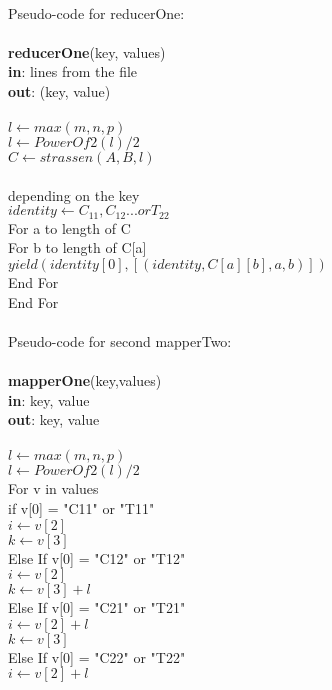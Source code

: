 \documentclass[10pt,a4paper]{article}
\begin{document}
\\Pseudo-code for reducerOne:\\ \\
\textbf{reducerOne}(key, values)\\
\textbf{in}: lines from the file\\
\textbf{out}: (key, value)\\\\
$l\leftarrow max(m,n,p)$\\
$l\leftarrow PowerOf2(l)/2$\\
$C\leftarrow strassen(A,B,l)$\\ \\
depending on the key\\
$identity \leftarrow C_{11}, C_{12} ... or T_{22}$\\
For a to length of C\\
\indent For b to length of C[a]\\
	\indent \indent $yield (identity[0], [(identity,C[a][b],a,b)])$\\
	\indent End For\\ 
End For\\
\\Pseudo-code for second mapperTwo:\\ \\
\textbf{mapperOne}(key,values)\\
\textbf{in}: key, value\\
\textbf{out}: key, value\\\\
$l\leftarrow max(m,n,p)$\\
$l\leftarrow PowerOf2(l)/2$\\
For v in values\\
\indent	if v[0] = "C11" or "T11"\\
	\indent\indent  $i \leftarrow v[2]$\\
	\indent\indent  $k \leftarrow v[3]$\\
	\indent Else If  v[0] = "C12" or "T12" \\
	\indent\indent  $i \leftarrow v[2]$\\
    \indent\indent  $k \leftarrow v[3]+l$\\
	\indent Else If  v[0] = "C21" or "T21"\\
	\indent\indent  $i \leftarrow v[2]+l$\\
	\indent\indent  $k \leftarrow v[3]$\\
	\indent Else If v[0] = "C22" or "T22"\\
	\indent\indent  $i \leftarrow v[2]+l$\\
\end{document}

